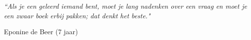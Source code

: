 \documentclass[11pt, a4paper, oneside]{Thesis} %
\begin{document}


\pagestyle{empty} %





\pagestyle{empty} %

\null\vfill %

\textit{``Als je een geleerd iemand bent, moet je lang nadenken over een vraag en moet je een zwaar boek erbij pakken; dat denkt het beste."}

\begin{flushright}
Eponine de Beer (7 jaar)
\end{flushright}

\vfill\vfill\vfill\vfill\vfill\vfill\null %

\clearpage %


\pagestyle{fancy} %

\tableofcontents %

\listoffigures %

\listoftables %
\end{document}
